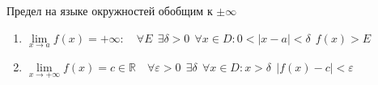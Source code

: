 Предел на языке окружностей обобщим к $\pm\infty$

\begin{enumerate}
    \item $\lim\limits_{x\to a}f(x)=+\infty: \quad \forall E \ \ \exists \delta>0 \ \ \forall x\in D : 0<|x-a|<\delta \ \ f(x)>E$
    \item $\lim\limits_{x\to +\infty}f(x)=c\in\mathbb{R} \quad \forall \varepsilon>0 \ \ \exists \delta \ \ \forall x\in D : x>\delta \ \ |f(x)-c|<\varepsilon$
\end{enumerate}

